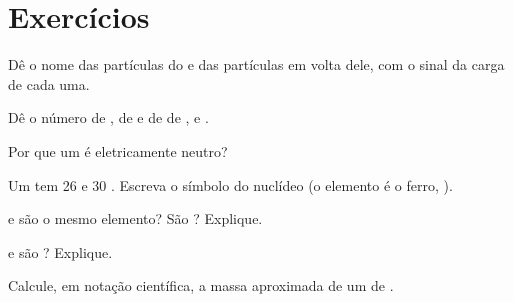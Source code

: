 \section{Exercícios}

\begin{exercise}[$\star$]\label{exo:g9:inside-the-atom:1}
Dê o nome das partículas do  e das partículas em volta dele, com o
sinal da carga de cada uma.
\end{exercise}

\begin{exercise}[$\star$]\label{exo:g9:inside-the-atom:2}
Dê o número de , de  e de  de ,
 e .
\end{exercise}

\begin{exercise}[$\star$]\label{exo:g9:inside-the-atom:3}
Por que um  é eletricamente neutro?
\end{exercise}

\begin{exercise}[$\star$]\label{exo:g9:inside-the-atom:4}
Um  tem 26  e 30 . Escreva o símbolo do nuclídeo
(o elemento é o ferro, ).
\end{exercise}

\begin{exercise}[$\star\star$]\label{exo:g9:inside-the-atom:5}
 e  são o mesmo elemento? São
? Explique.
\end{exercise}

\begin{exercise}[$\star\star$]\label{exo:g9:inside-the-atom:6}
 e  são ? Explique.
\end{exercise}

\begin{exercise}[$\star\star$]\label{exo:g9:inside-the-atom:7}
Calcule, em notação científica, a massa aproximada de um  de
.
\end{exercise}

